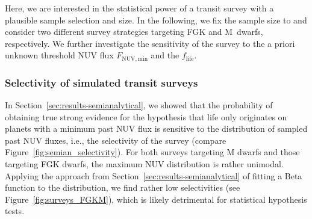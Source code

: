\documentclass[twocolumn,twocolappendix,linenumbers]{aastex631}
\begin{document}
Here, we are interested in the statistical power of a transit survey with a plausible sample selection and size.
In the following, we fix the sample size to  and consider two different survey strategies targeting FGK and M~dwarfs, respectively.
We further investigate the sensitivity of the survey to the a priori unknown threshold \gls{NUV} flux $F_\mathrm{NUV, min}$ and the  $f_\mathrm{life}$.

\subsubsection{Selectivity of simulated transit surveys}
In Section~\ref{sec:results-semianalytical}, we showed that the probability of obtaining true strong evidence for the hypothesis that life only originates on planets with a minimum past \gls{NUV} flux is sensitive to the distribution of sampled past \gls{NUV} fluxes, i.e., the selectivity of the survey (compare Figure~\ref{fig:semian_selectivity}).
For both surveys targeting M dwarfs and those targeting FGK dwarfs, the maximum \gls{NUV} distribution is rather unimodal.
Applying the approach from Section~\ref{sec:results-semianalytical} of fitting a Beta function to the distribution, we find rather low selectivities (see Figure~\ref{fig:surveys_FGKM}), which is likely detrimental for statistical hypothesis tests.

\end{document}

